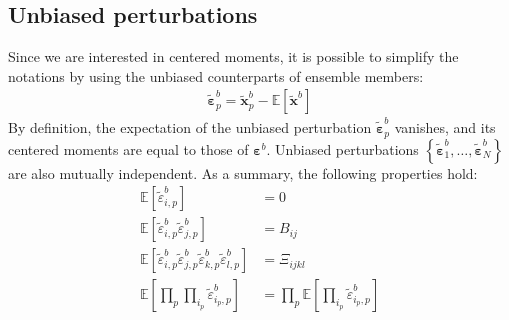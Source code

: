 \documentclass[12pt]{scrartcl}
\begin{document}
\subsection{Unbiased perturbations}
Since we are interested in centered moments, it is possible to simplify the notations by using the unbiased counterparts of ensemble members:
\begin{align}
\widetilde{\boldsymbol{\varepsilon}}^b_p = \widetilde{\mathbf{x}}^b_p - \mathbb{E} \left[\widetilde{\mathbf{x}}^b\right]
\end{align}
By definition, the expectation of the unbiased perturbation $\widetilde{\boldsymbol{\varepsilon}}^b_p$ vanishes, and its centered moments are equal to those of $\boldsymbol{\varepsilon}^b$. Unbiased perturbations $\left\{\widetilde{\boldsymbol{\varepsilon}}^b_1,\dots,\widetilde{\boldsymbol{\varepsilon}}^b_N\right\}$ are also mutually independent. As a summary, the following properties hold:
\begin{subequations}
\begin{align}
\label{eq:prop_pert_1}
\mathbb{E} \left[\widetilde{\varepsilon}^b_{i,p}\right] & = 0 \\
\label{eq:prop_pert_2}
\mathbb{E} \left[\widetilde{\varepsilon}^b_{i,p} \widetilde{\varepsilon}^b_{j,p}\right] & = B_{ij} \\
\label{eq:prop_pert_3}
\mathbb{E} \left[\widetilde{\varepsilon}^b_{i,p} \widetilde{\varepsilon}^b_{j,p} \widetilde{\varepsilon}^b_{k,p} \widetilde{\varepsilon}^b_{l,p}\right] & = \Xi_{ijkl} \\
\label{eq:prop_pert_4}
\mathbb{E} \left[\prod_{p} \prod_{i_p} \widetilde{\varepsilon}^b_{i_p,p}\right] & = \prod_{p} \mathbb{E} \left[\prod_{i_p}  \widetilde{\varepsilon}^b_{i_p,p}\right]
\end{align}
\end{subequations}
\end{document}
